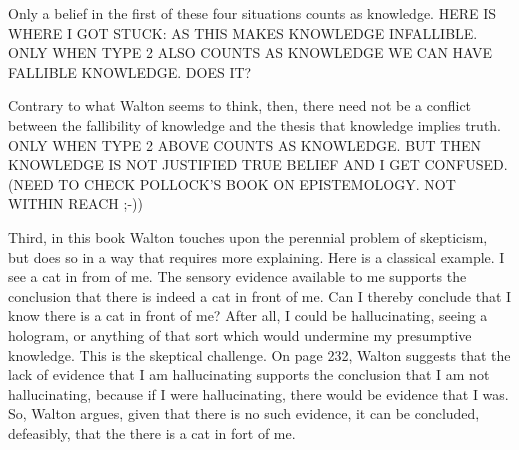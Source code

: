 \documentclass[12pt]{article}
\begin{document}
\noindent Only a belief in the first of these four situations counts as knowledge. HERE IS WHERE I GOT STUCK: AS THIS MAKES KNOWLEDGE INFALLIBLE. ONLY WHEN TYPE 2 ALSO COUNTS AS KNOWLEDGE WE CAN HAVE FALLIBLE KNOWLEDGE. DOES IT?

Contrary to what Walton seems to think, then, there need not be a conflict between the 
fallibility of knowledge and the thesis that
knowledge implies truth. ONLY WHEN TYPE 2 ABOVE COUNTS AS KNOWLEDGE. BUT THEN KNOWLEDGE IS NOT JUSTIFIED TRUE BELIEF AND I GET CONFUSED. (NEED TO CHECK POLLOCK'S BOOK ON EPISTEMOLOGY. NOT WITHIN REACH ;-))

Third, in this book Walton touches upon the 
perennial problem of skepticism, but does so in a way that requires 
more explaining. Here is a classical example. 
I see a cat in from of me. The sensory evidence available to me supports 
the conclusion that there is indeed a cat in front of me. 
Can I thereby conclude that I know there is a cat in front of me?
After all, I could be hallucinating, seeing a hologram, or anything of 
that sort which would undermine my presumptive knowledge. This is the skeptical challenge.
On page 232, %
Walton suggests that the lack of evidence that I am hallucinating supports the conclusion
that I am not hallucinating, because if I were hallucinating, there would be
evidence that I was. So, Walton argues, given that there is no such
evidence, it can be concluded, defeasibly, that the 
there is a cat in fort of me.  
\end{document}
